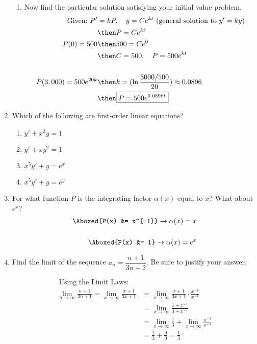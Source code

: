 \documentclass{nosvagor-notes}
\begin{document}
\begin{enumerate}
\begin{enumerate}
      \item Now find the particular solution satisfying your initial value
        problem.
        \begin{align*}
          ~\text{Given:}~ P'&=kP, \quad y = Ce^{kt} ~(\text{general solution to}~y'=ky)\\
                   &\then P = Ce^{kt} \\
          P(0) = 500 &\then 500 = Ce^{0} \\
                     &\then C = 500, \quad P = 500e^{kt} \\\\
          P(3,000) = 500 e^{20k} &\then k = (\ln \frac{3000/500}{20}) \approx 0.0896 \\
                     &\then \boxed{P = 500e^{0.0896t}}
        \end{align*}
        \vspace{30pt}
    \end{enumerate}

  \item Which of the following are first-order linear equations?
    \begin{multicols}{2}
    \begin{enumerate}
      \item \(y'+ x^2y = 1\) 
      \item \(y' + xy^2 = 1\) 
      \item \(x^5y' + y = e^x\) 
      \item \(x^5y' + y = e^y\) 
    \end{enumerate}
    \end{multicols}
    \vspace{40pt}

  \item For what function \(P\) is the integrating factor \(\alpha (x) \) equal
    to \(x?\) What about \(e^x\)?
    \begin{align*}
      \Aboxed{P(x) &= x^{-1}} \to \alpha (x) = x \\\\
      \Aboxed{P(x) &= 1} \to \alpha (x) = e^x
    \end{align*}

  \newpage

  \item Find the limit of the sequence \(a_n = \dfrac{n+1}{3n+2}\). Be sure to
    justify your answer.

    \begin{align*}
      ~\text{Using the Limit Laws:} \\
      \lim_{n \to \infty}\frac{n+1}{3n+1} =
      \lim_{x \to \infty} \frac{x+1}{3x+1} &=
      \lim_{x \to \infty} \frac{x+1}{3x+1} \cdot \frac{x^{-1}}{x^{-1}} \\
      &= \lim_{x \to \infty} \frac{1+x^{-1}}{3+x^{-1}} \\
      &= \lim_{x \to \infty} \frac{1}{3} + \lim_{x \to \infty} \frac{x^{-1}}{x^{-1}} \\
      &= \frac{1}{3} + \frac{0}{0} = \boxed{\frac{1}{3}}
    \end{align*}


\end{enumerate}
\end{document}
